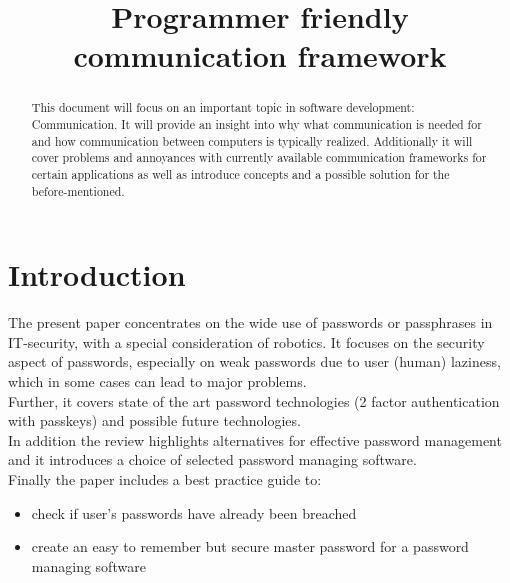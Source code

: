 \documentclass[conference]{IEEEtran}
\begin{document}
\title{Programmer friendly communication framework}

\author{
    \and
}

\maketitle

\begin{abstract}
    This document will focus on an important topic in software development: Communication. It will provide an insight into why what communication is needed for and how communication between computers is typically realized. Additionally it will cover problems and annoyances with currently available communication frameworks for certain applications as well as introduce concepts and a possible solution for the before-mentioned. 
\end{abstract}


\section{Introduction}

The present paper concentrates on the wide use of passwords or passphrases in IT-security, with a special consideration of robotics. It focuses on the security aspect of passwords, especially on weak passwords due to user (human) laziness, which in some cases can lead to major problems. \\
Further, it covers state of the art password technologies (2 factor authentication with passkeys) and possible future technologies.\\
In addition the review highlights alternatives for effective password management and it introduces a choice of selected password managing software. \\
Finally the paper includes a best practice guide to:
\begin{itemize}
    \item check if user's passwords have already been breached
    \item create an easy to remember but secure master password for a password managing software
\end{itemize}
\end{document}
